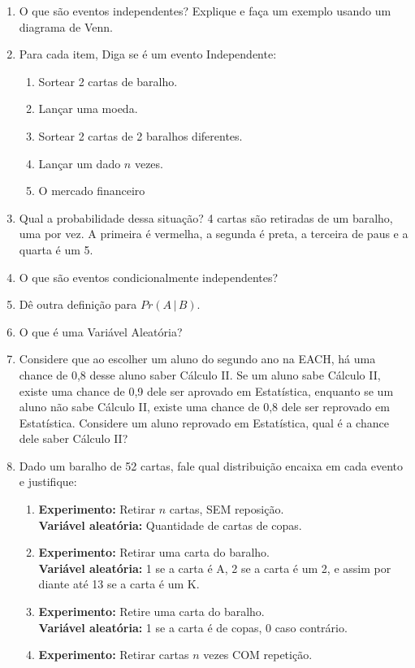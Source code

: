 \documentclass[11pt, a4paper]{article}
\begin{document}
\begin{enumerate}
\item O que são eventos independentes? Explique e faça um exemplo usando um diagrama de Venn.
\item Para cada item, Diga se é um evento Independente:
	\begin{enumerate}
	\item Sortear 2 cartas de baralho.
	\item Lançar uma moeda.
	\item Sortear 2 cartas de 2 baralhos diferentes.
	\item Lançar um dado $n$ vezes.
	\item O mercado financeiro
	\end{enumerate}
\item Qual a probabilidade dessa situação? 4 cartas são retiradas de um baralho, uma por vez. A primeira é vermelha, a segunda é preta, a terceira de paus e a quarta é um 5.
\item O que são eventos condicionalmente independentes?
\item Dê outra definição para $Pr(A\,|\,B)$.
\item O que é uma Variável Aleatória?
\item Considere que ao escolher um aluno do segundo ano na EACH, há uma chance de 0,8 desse aluno saber Cálculo II. Se um aluno sabe Cálculo II, existe uma chance de 0,9 dele ser aprovado em Estatística, enquanto se um aluno não sabe Cálculo II, existe uma chance de 0,8 dele ser reprovado em Estatística. Considere um aluno reprovado em Estatística, qual é a chance dele saber Cálculo II?
\item Dado um baralho de 52 cartas, fale qual distribuição encaixa em cada evento e justifique:
	\begin{enumerate}
	\item \textbf{Experimento:} Retirar $n$ cartas, SEM reposição. 
	\\\textbf{Variável aleatória:} Quantidade de cartas de copas.
	\item \textbf{Experimento:} Retirar uma carta do baralho. 
	\\\textbf{Variável aleatória:} 1 se a carta é A, 2 se a carta é um 2, e assim por diante até 13 se a carta é um K.
	\item \textbf{Experimento:} Retire uma carta do baralho. 
	\\\textbf{Variável aleatória:} 1 se a carta é de copas, 0 caso contrário.
	\item \textbf{Experimento:} Retirar cartas $n$ vezes COM repetição.

\end{enumerate}
\end{enumerate}
\end{document}
